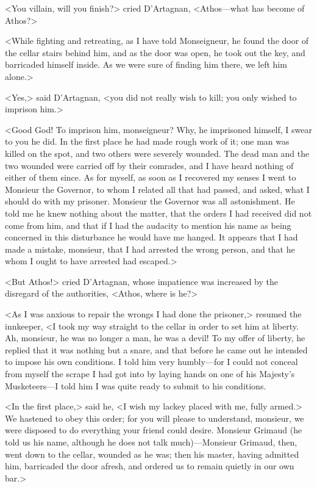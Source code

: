 <You villain, will you finish?> cried D'Artagnan, <Athos—what has become of Athos?> 

<While fighting and retreating, as I have told Monseigneur, he found the door of the cellar stairs behind him, and as the door was open, he took out the key, and barricaded himself inside. As we were sure of finding him there, we left him alone.> 

<Yes,> said D'Artagnan, <you did not really wish to kill; you only wished to imprison him.> 

<Good God! To imprison him, monseigneur? Why, he imprisoned himself, I swear to you he did. In the first place he had made rough work of it; one man was killed on the spot, and two others were severely wounded. The dead man and the two wounded were carried off by their comrades, and I have heard nothing of either of them since. As for myself, as soon as I recovered my senses I went to Monsieur the Governor, to whom I related all that had passed, and asked, what I should do with my prisoner. Monsieur the Governor was all astonishment. He told me he knew nothing about the matter, that the orders I had received did not come from him, and that if I had the audacity to mention his name as being concerned in this disturbance he would have me hanged. It appears that I had made a mistake, monsieur, that I had arrested the wrong person, and that he whom I ought to have arrested had escaped.> 

<But Athos!> cried D'Artagnan, whose impatience was increased by the disregard of the authorities, <Athos, where is he?> 

<As I was anxious to repair the wrongs I had done the prisoner,> resumed the innkeeper, <I took my way straight to the cellar in order to set him at liberty. Ah, monsieur, he was no longer a man, he was a devil! To my offer of liberty, he replied that it was nothing but a snare, and that before he came out he intended to impose his own conditions. I told him very humbly—for I could not conceal from myself the scrape I had got into by laying hands on one of his Majesty's Musketeers—I told him I was quite ready to submit to his conditions. 

<In the first place,> said he, <I wish my lackey placed with me, fully armed.> We hastened to obey this order; for you will please to understand, monsieur, we were disposed to do everything your friend could desire. Monsieur Grimaud (he told us his name, although he does not talk much)—Monsieur Grimaud, then, went down to the cellar, wounded as he was; then his master, having admitted him, barricaded the door afresh, and ordered us to remain quietly in our own bar.> 

